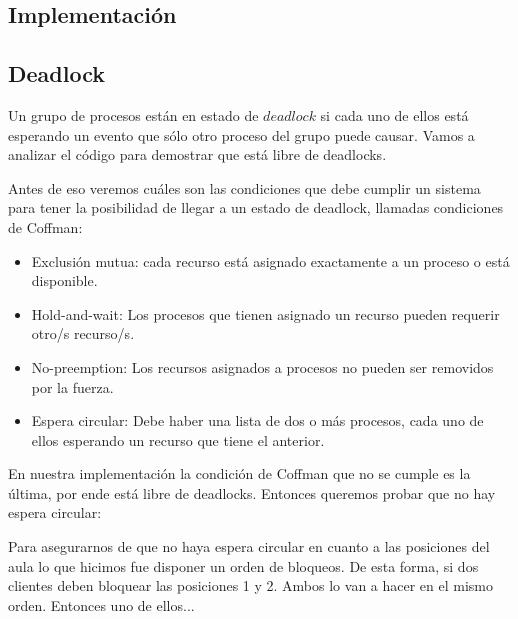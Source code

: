 
\subsection{Implementación}

\subsection{Deadlock}
Un grupo de procesos están en estado de $deadlock$ si cada uno de ellos está esperando un evento que sólo otro proceso del grupo puede causar.
Vamos a analizar el código para demostrar que está libre de deadlocks.

Antes de eso veremos cuáles son las condiciones que debe cumplir un sistema para tener la posibilidad de llegar a un estado de deadlock, llamadas
condiciones de Coffman:
\begin{itemize}
 \item Exclusión mutua: cada recurso está asignado exactamente a un proceso o está disponible.
 \item Hold-and-wait: Los procesos que tienen asignado un recurso pueden requerir otro/s recurso/s.
 \item No-preemption: Los recursos asignados a procesos no pueden ser removidos por la fuerza.
 \item Espera circular: Debe haber una lista de dos o más procesos, cada uno de ellos esperando un recurso que tiene el anterior.
\end{itemize}

En nuestra implementación la condición de Coffman que no se cumple es la última, por ende está libre de deadlocks.
Entonces queremos probar que no hay espera circular:

Para asegurarnos de que no haya espera circular en cuanto a las posiciones del aula lo que hicimos fue disponer un orden de bloqueos.
De esta forma, si dos clientes deben bloquear las posiciones 1 y 2. Ambos lo van a hacer en el mismo orden. Entonces uno de ellos... %



